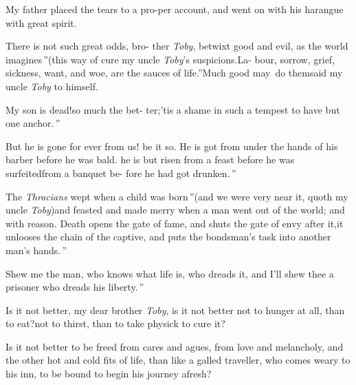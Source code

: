 \documentclass{article}
\begin{document}
\tsk My father placed the tears to a pro-\break per account, and went
on with his harangue with great spirit.

\indent\lqq There is not such great odds, bro-\break
\lqq ther \textit{Toby}, betwixt good and evil, as\break
\lqq the world imagines\,”\tsh (this way of
cure my uncle \textit{Toby}’s suspicions.\sic\tsk \lqq La-\break
\lqq bour, sorrow, grief, sickness, want, and\break
\lqq woe, are the sauces of life.”\tsk Much\break
good may\sic\ do them\tsk said my uncle \textit{Toby}\break 
to himself.\tsh

\indent\lqq My son is dead!\tsk so much the bet-\break
\lqq ter;\tsk ’tis a shame in such a tempest to\break
\lqq have but one anchor.\,”

\indent\lqq But he is gone for ever from us!\tsk\break
\lqq be it so. He is got from under the\break
\lqq hands of his barber before he was bald.\break
\lqq \tsk he is but risen from a feast before \break
\lqq he was surfeited\tsk from a banquet be-\break
\lqq fore he had got drunken.\,”

\indent\lqq The \textit{Thracians} wept when a child\break
\lqq was born\,”\tsk (and we were very near\break
\lqq it, quoth my uncle \textit{Toby})\tsk \lqq and feasted\break
\lqq and made merry when a man went \break
\lqq out of the world; and with reason.\tsk{}
\lqq Death opens the gate of fame, and\break
\lqq shuts the gate of envy after it,\tsk it\break
\lqq unlooses the chain of the captive, and \break
\lqq puts the bondsman’s task into another\break
\lqq man’s hands.\,”

\indent\lqq Shew me the man, who knows what\break
\lqq life is, who dreads it, and I’ll shew thee\break
\lqq a prisoner who dreads his liberty.\,”

Is it not better, my dear brother \textit{Toby},\break
{}\break
\tsk is it not better not to hunger at all, than to eat?\tsk not to thirst, than to
take physick to cure it?

Is it not better to be freed from cares and agues, from love and
melancholy, and the other hot and cold fits of life, than like
a galled traveller, who comes weary to his inn, to be bound to
begin his journey afresh?
\end{document}
